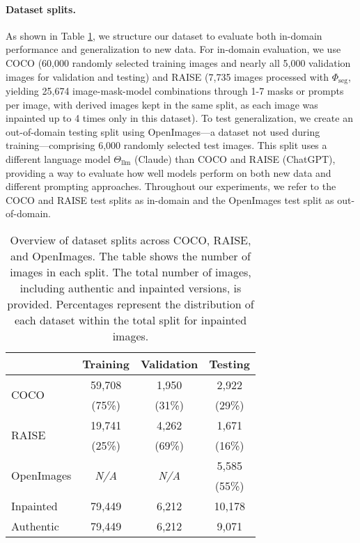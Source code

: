 \paragraph{Dataset splits.}
As shown in Table \ref{tab:dataset_splits}, we structure our dataset to evaluate both in-domain performance and generalization to new data. For in-domain evaluation, we use COCO (60,000 randomly selected training images and nearly all 5,000 validation images for validation and testing) and RAISE (7,735 images processed with $\Phi_\text{seg}$, yielding 25,674 image-mask-model combinations through 1-7 masks or prompts per image, with derived images kept in the same split, as each image was inpainted up to 4 times only in this dataset). To test generalization, we create an out-of-domain testing split using OpenImages—a dataset not used during training—comprising 6,000 randomly selected test images. This split uses a different language model $\Theta_\text{llm}$ (Claude) than COCO and RAISE (ChatGPT), providing a way to evaluate how well models perform on both new data and different prompting approaches. Throughout our experiments, we refer to the COCO and RAISE test splits as in-domain and the OpenImages test split as out-of-domain.

\begin{table}[!htbp]
\centering
\begin{tabular}{lccc}
\hline
 & Training & Validation & Testing \\
\hline
\multirow{2}{*}{COCO \cite{lin2014coco}} & 59,708 & 1,950 & 2,922 \\
 & (75\%) & (31\%) & (29\%) \\
\multirow{2}{*}{RAISE \cite{dang2015raise}} & 19,741 & 4,262 & 1,671 \\
 & (25\%) & (69\%) & (16\%) \\
\multirow{2}{*}{OpenImages \cite{benenson2022openimages}} & \multirow{2}{*}{\textit{N/A}} & \multirow{2}{*}{\textit{N/A}} & 5,585 \\
 & & & (55\%) \\
 \hline
Inpainted & 79,449 & 6,212 & 10,178 \\
Authentic & 79,449 & 6,212 & 9,071 \\
\hline
\end{tabular}
\caption{Overview of dataset splits across COCO, RAISE, and OpenImages. The table shows the number of images in each split. The total number of images, including authentic and inpainted versions, is provided. Percentages represent the distribution of each dataset within the total split for inpainted images.}
\label{tab:dataset_splits}
\end{table}

\vspace{-10pt}
